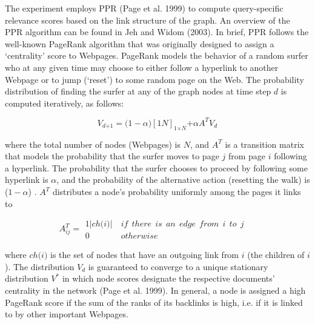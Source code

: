 \documentclass{article} %
\begin{document}
 

The experiment employs PPR (Page et al. 1999) to compute query-specific relevance scores based on the link structure of the graph. An overview of the PPR algorithm can be found in Jeh and Widom (2003). In brief, PPR follows the well-known PageRank algorithm that was originally designed to assign a `centrality' score to Webpages. PageRank models the behavior of a random surfer who at any given time may choose to either follow a hyperlink to another Webpage or to jump (`reset') to some random page on the Web. The probability distribution of finding the surfer at any of the graph nodes at time step $d$ is computed iteratively, as follows: 


\begin{equation} \label{GrindEQ__1_} 
V_{d\mathrm{+1}}\mathrm{=(1-}\alpha \mathrm{)}{\left[\mathrm{1}N\right]}_{\mathrm{1}\mathrm{\times }N}\mathrm{+}\alpha A^TV_d 
\end{equation} 



\noindent where the total number of nodes (Webpages) is $N$, and $A^T$ is a transition matrix that models the probability that the surfer moves to page $j$ from page $i$ following a hyperlink. The probability that the surfer chooses to proceed by following some hyperlink is $\alpha $, and the probability of the alternative action (resetting the walk) is ($\mathrm{1-}\alpha $) . $A^T$ distributes a node's probability uniformly among the pages it links to

\noindent 
\begin{equation} \label{GrindEQ__2_} 
A^T_{ij}\mathrm{=} \begin{array}{lll}
\mathrm{1|}ch\mathrm{(}i\mathrm{)|} & \mathrm{\ }if\mathrm{\ \ }there\mathrm{\ \ }is\mathrm{\ \ }an\mathrm{\ \ }edge\mathrm{\ \ }from\mathrm{\ \ }i\mathrm{\ \ }to\mathrm{\ \ }j\mathrm{\ } &  \\ 
0 & \mathrm{\ }otherwise\mathrm{\ } &  \end{array}
 
\end{equation} 


\noindent where $ch\mathrm{(}i\mathrm{)}$ is the set of nodes that have an outgoing link from $i$ (the children of $i$). The distribution $V_d$ is guaranteed to converge to a unique stationary distribution $V^{\mathrm{*}}$ in which node scores designate the respective documents' centrality in the network (Page et al. 1999). In general, a node is assigned a high PageRank score if the sum of the ranks of its backlinks is high, i.e. if it is linked to by other important Webpages.
\end{document}
